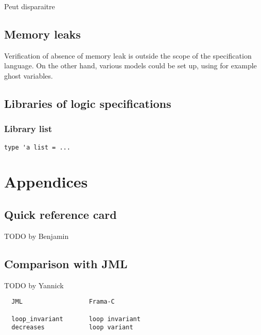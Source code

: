 \documentclass[a4paper,11pt,twoside,openright]{report}
\begin{document}
\strlen

Peut disparaitre

\section{Memory leaks}

\experimental

Verification of absence of memory leak is outside the scope of the
specification language. On the other hand, various models could be set
up, using for example ghost variables.


\section{Libraries of logic specifications}
\label{sec:speclibraries}

\subsection{Library list}

\begin{verbatim}
type 'a list = ...
\end{verbatim}

\appendix

\chapter{Appendices}

\section{Quick reference card}

TODO by Benjamin

\section{Comparison with JML}

TODO by Yannick

\begin{verbatim}
  JML                  Frama-C

  loop_invariant       loop invariant 
  decreases            loop variant

\end{verbatim}

\cleardoublepage
{}


\cleardoublepage
{}
\listoffigures

\cleardoublepage
{}
\printindex
\end{document}
